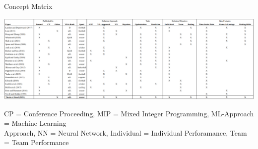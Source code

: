 \clearpage\pagestyle{empty} %
\begin{landscape} %
\begin{table}[h]
    \caption{Concept Matrix}
    \centering
    \includegraphics[width=25cm]{chapter/3_literature_review/section/matrix.png}
    \label{tab:concept_matrix}
\end{table}
\footnotesize \noindent CP = Conference Proceeding, MIP = Mixed Integer Programming, ML-Approach = Machine Learning \\
Approach, NN = Neural Network, Individual = Individual Perforamance, Team = Team Performance 

\restoregeometry %

\end{landscape}
\pagestyle{scrheadings} %